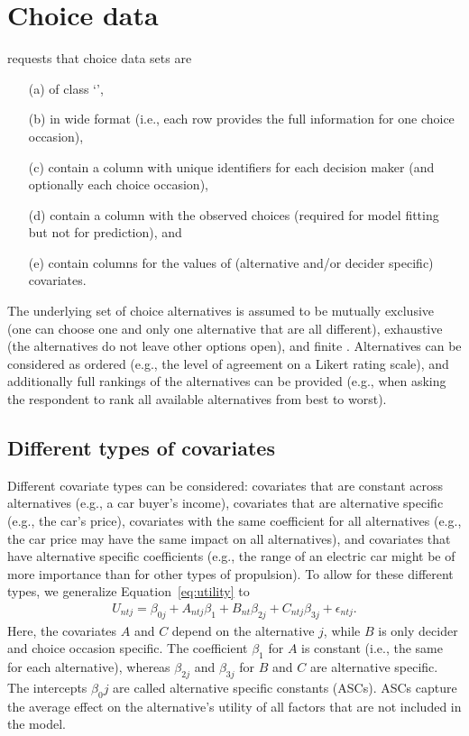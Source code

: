 \documentclass[article,shortnames]{jss}
\newcommand{\class}[1]{`\code{#1}'}
\begin{document}
\section{Choice data} \label{sec:choice_data}

 requests that choice data sets are
\begin{itemize}
  \item[(a)] of class \class{data.frame},
  \item[(b)] in wide format (i.e., each row provides the full information for one choice occasion),
  \item[(c)] contain a column with unique identifiers for each decision maker (and optionally each choice occasion),
  \item[(d)] contain a column with the observed choices (required for model fitting but not for prediction), and
  \item[(e)] contain columns for the values of (alternative and/or decider specific) covariates.
\end{itemize}
The underlying set of choice alternatives is assumed to be mutually exclusive (one can choose one and only one alternative that are all different), exhaustive (the alternatives do not leave other options open), and finite \citep[Ch.\ 2]{Train:2009}. Alternatives can be considered as ordered (e.g., the level of agreement on a Likert rating scale), and additionally full rankings of the alternatives can be provided (e.g., when asking the respondent to rank all available alternatives from best to worst).

\subsection{Different types of covariates} \label{subsec:covariate_types}

Different covariate types can be considered: covariates that are constant across alternatives (e.g., a car buyer's income), covariates that are alternative specific (e.g., the car's price), covariates with the same coefficient for all alternatives (e.g., the car price may have the same impact on all alternatives), and covariates that have alternative specific coefficients (e.g., the range of an electric car might be of more importance than for other types of propulsion). To allow for these different types, we generalize Equation~\ref{eq:utility} to
%
\begin{align}
  \label{eq:utility_gen}
  U_{ntj} = \beta_{0j} + A_{ntj} \beta_1 + B_{nt} \beta_{2j} + C_{ntj} \beta_{3j} + \epsilon_{ntj}.
\end{align}
%
Here, the covariates $A$ and $C$ depend on the alternative $j$, while $B$ is only decider and choice occasion specific. The coefficient $\beta_1$ for $A$ is constant (i.e., the same for each alternative), whereas $\beta_{2j}$ and $\beta_{3j}$ for $B$ and $C$ are alternative specific. The intercepts $\beta_0j$ are called alternative specific constants (ASCs). ASCs capture the average effect on the alternative's utility of all factors that are not included in the model.
\end{document}
